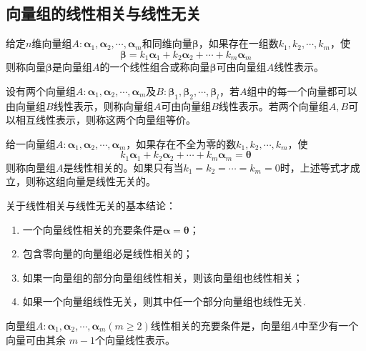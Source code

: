 \subsection{向量组的线性相关与线性无关}
\begin{definition}
    给定$n$维向量组$A:\boldsymbol{\alpha}_1,\boldsymbol{\alpha}_2,\cdots,\boldsymbol{\alpha}_m$和同维向量$\boldsymbol{\beta}$，如果存在一组数$k_1,k_2,\cdots,k_m$，使
    $$\boldsymbol{\beta}=k_1\boldsymbol{\alpha}_1+k_2\boldsymbol{\alpha}_2+\cdots+k_m\boldsymbol{\alpha}_m$$
    则称向量$\boldsymbol{\beta}$是向量组$A$的一个线性组合或称向量$\boldsymbol{\beta}$可由向量组$A$线性表示。
\end{definition}

\begin{definition}[等价向量组]
    设有两个向量组$A:\boldsymbol{\alpha}_1,\boldsymbol{\alpha}_2,\cdots,\boldsymbol{\alpha}_m$及$B:\boldsymbol{\beta}_1,\boldsymbol{\beta}_2,\cdots,\boldsymbol{\beta}_l$，若$A$组中的每一个向量都可以
    由向量组$B$线性表示，则称向量组$A$可由向量组$B$线性表示。若两个向量组$A,B$可以相互线性表示，则称这两个{\heiti 向量组等价}。
\end{definition}

\begin{definition}[线性相关与线性无关]
    给一向量组$A:\boldsymbol{\alpha}_1,\boldsymbol{\alpha}_2,\cdots,\boldsymbol{\alpha}_m$，如果存在不全为零的数$k_1,k_2,\cdots,k_m$，使
    $$k_1\boldsymbol{\alpha}_1+k_2\boldsymbol{\alpha}_2+\cdots+k_m\boldsymbol{\alpha}_m=\boldsymbol{\theta}$$
    则称向量组$A$是{\heiti 线性相关}的。如果只有当$k_1=k_2=\cdots=k_m=0$时，上述等式才成立，则称这组向量是{\heiti 线性无关}的。
\end{definition}

\begin{theorem}
    关于线性相关与线性无关的基本结论：
    \begin{enumerate}[(1)]
        \item 一个向量线性相关的充要条件是$\boldsymbol{\alpha}=\boldsymbol{\theta}$；
        \item 包含零向量的向量组必是线性相关的；
        \item 如果一向量组的部分向量组线性相关，则该向量组也线性相关；
        \item 如果一个向量组线性无关，则其中任一个部分向量组也线性无关.
    \end{enumerate}
\end{theorem}

\begin{theorem}
    向量组$A:\boldsymbol{\alpha}_1,\boldsymbol{\alpha}_2,\cdots,\boldsymbol{\alpha}_m(m\geq 2)$线性相关的充要条件是，向量组$A$中至少有一个向量可由其余
    $m-1$个向量线性表示。
\end{theorem}

